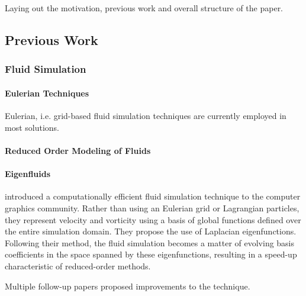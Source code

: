 \chapter{\bevezetes}

Laying out the motivation, previous work and overall structure of the paper.


\section{Previous Work}
\subsection{Fluid Simulation}

\subsubsection*{Eulerian Techniques}
Eulerian, i.e. grid-based fluid simulation techniques are currently employed in
most solutions. 

\subsubsection*{Reduced Order Modeling of Fluids}

\subsubsection*{Eigenfluids}

\cite{dewitt} introduced a computationally efficient fluid simulation technique
to the computer graphics community. Rather than using an Eulerian grid or
Lagrangian particles, they represent velocity and vorticity using a basis of
global functions defined over the entire simulation domain. They propose the use
of Laplacian eigenfunctions. Following their method, the fluid simulation
becomes a matter of evolving basis coefficients in the space spanned by
these eigenfunctions, resulting in a speed-up characteristic of reduced-order
methods.

Multiple follow-up papers proposed improvements to the technique.

